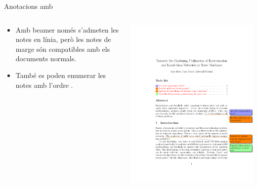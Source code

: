 \begin{frame}[fragile]{Anotacions amb \protect{}}
\begin{columns}
  \begin{column}{0.4\textwidth}
    \begin{itemize}
    \item Amb beamer només s'admeten les notes en línia, 
        però les notes de marge són compatibles amb els documents normals.
    \item També es poden enumerar les notes amb l'ordre .
    \end{itemize}
  \end{column}
  \begin{column}{0.6\textwidth}
    \includegraphics[width=\textwidth,page=1]{todonotes-example}
  \end{column}
\end{columns}
\end{frame}

